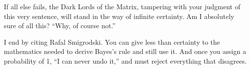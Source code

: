 If all else fails, the Dark Lords of the Matrix, tampering with your judgment of this very sentence, will stand in the way of infinite certainty. Am I absolutely sure of all this? ``Why, of course not.''

I end by citing Rafal Smigrodski. You can give less than certainty to the mathematics needed to derive Bayes's rule and still use it. And once you assign a probability of 1, ``I can never undo it,'' and must reject everything that disagrees. 
